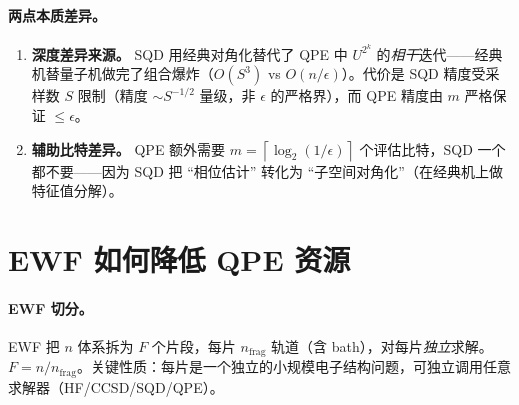 \documentclass[11pt]{article}
\newcommand{\eps}{\epsilon}
\newcommand{\Oof}[1]{O(#1)}
\newcommand{\ceil}[1]{\left\lceil #1 \right\rceil}
\begin{document}
\paragraph{两点本质差异。}
\begin{enumerate}
  \item \textbf{深度差异来源。} SQD 用经典对角化替代了 QPE 中 $U^{2^k}$ 的\emph{相干}迭代——经典机替量子机做完了组合爆炸（$\Oof{S^3}$ vs $\Oof{n/\eps}$）。代价是 SQD 精度受采样数 $S$ 限制（精度 $\sim S^{-1/2}$ 量级，非 $\eps$ 的严格界），而 QPE 精度由 $m$ 严格保证 $\le\eps$。
  \item \textbf{辅助比特差异。} QPE 额外需要 $m=\ceil{\log_2(1/\eps)}$ 个评估比特，SQD 一个都不要——因为 SQD 把 ``相位估计'' 转化为 ``子空间对角化''（在经典机上做特征值分解）。
\end{enumerate}

\section{EWF 如何降低 QPE 资源}
\paragraph{EWF 切分。} EWF 把 $n$ 体系拆为 $F$ 个片段，每片 $n_{\mathrm{frag}}$ 轨道（含 bath），对每片\emph{独立}求解。$F=n/n_{\mathrm{frag}}$。关键性质：每片是一个独立的小规模电子结构问题，可独立调用任意求解器（HF/CCSD/SQD/QPE）。
\end{document}
